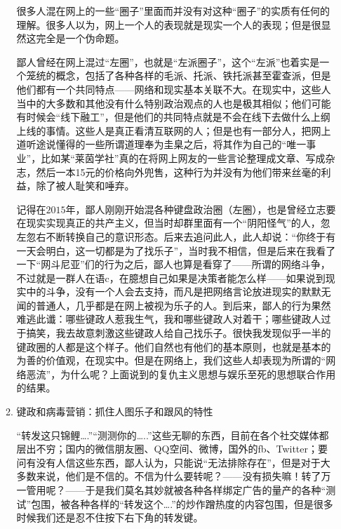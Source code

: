 \documentclass{ctexart}
\begin{document}
\begin{itemize}
\begin{enumerate}
	很多人混在网上的一些“圈子”里面而并没有对这种“圈子”的实质有任何的理解。很多人以为，网上一个人的表现就是现实一个人的表现；但是很显然这完全是一个伪命题。
	
	鄙人曾经在网上混过“左圈”，也就是“左派圈子”，这个“左派”也着实是一个笼统的概念，包括了各种各样的毛派、托派、铁托派甚至霍查派，但是他们都有一个共同特点——网络和现实基本关联不大。在现实中，这些人当中的大多数和其他没有什么特别政治观点的人也是极其相似；他们可能有时候会“线下融工”，但是他们的共同特点就是不会在线下去做什么上纲上线的事情。这些人是真正看清互联网的人；但是也有一部分人，把网上道听途说懂得的一些所谓道理奉为圭臬之后，将其作为自己的“唯一事业”，比如某“莱茵学社”真的在将网上网友的一些言论整理成文章、写成杂志，然后一本15元的价格向外兜售，这种行为并没有为他们带来丝毫的利益，除了被人耻笑和唾弃。
	
	记得在$2015$年，鄙人刚刚开始混各种键盘政治圈（左圈），也是曾经立志要在现实实现真正的共产主义，但当时却群里面有一个“阴阳怪气”的人，忽左忽右不断转换自己的意识形态。后来去追问此人，此人却说：“你终于有一天会明白，这一切都是为了找乐子”，当时我不相信，但是后来在我看了一下“网斗尼亚”们的行为之后，鄙人也算是看穿了——所谓的网络斗争，不过就是一群人在语c，在臆想自己如果是决策者能怎么样——如果说到现实中的斗争，没有一个人会去支持，而凡是把网络言论放进现实的默默无闻的普通人，几乎都是在网上被视为乐子的人。到后来，鄙人的行为果然难逃此谶：哪些键政人惹我生气，我和哪些键政人对着干；哪些键政人过于搞笑，我去故意刺激这些键政人给自己找乐子。很快我发现似乎一半的键政圈的人都是这个样子。他们自然也有他们的基本原则，也就是基本的为善的价值观，在现实中。但是在网络上，我们这些人却表现为所谓的“网络恶流”，为什么呢？上面说到的复仇主义思想与娱乐至死的思想联合作用的结果。
	
	\item 键政和病毒营销：抓住人图乐子和跟风的特性
	
	“转发这只锦鲤….”“测测你的…..”这些无聊的东西，目前在各个社交媒体都层出不穷；国内的微信朋友圈、QQ空间、微博，国外的fb、Twitter；要问有没有人信这些东西，鄙人认为，只能说“无法排除存在”，但是对于大多数来说，他们是不信的。不信为什么要转呢？——没有损失嘛！转了万一管用呢？——于是我们莫名其妙就被各种各样绑定广告的量产的各种“测试”包围，被各种各样的“转发这个….”的炒作蹭热度的内容包围，但是很多时候我们还是忍不住按下右下角的转发键。
	

\end{enumerate}
\end{itemize}
\end{document}
